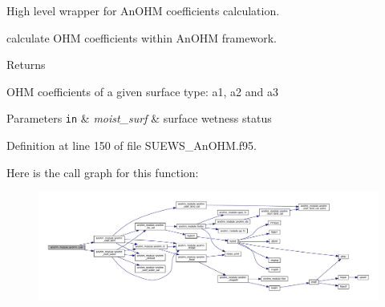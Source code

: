 High level wrapper for An\+O\+HM coefficients calculation. 

calculate O\+HM coefficients within An\+O\+HM framework. \begin{DoxyReturn}{Returns}

\begin{DoxyEnumerate}
\item O\+HM coefficients of a given surface type\+: a1, a2 and a3
\end{DoxyEnumerate}
\end{DoxyReturn}

\begin{DoxyParams}[1]{Parameters}
\mbox{\tt in}  & {\em moist\+\_\+surf} & surface wetness status \\
\hline
\end{DoxyParams}


Definition at line 150 of file S\+U\+E\+W\+S\+\_\+\+An\+O\+H\+M.\+f95.

Here is the call graph for this function\+:\nopagebreak
\begin{figure}[H]
\begin{center}
\leavevmode
\includegraphics[width=350pt]{namespaceanohm__module_a5aa773c6b5c4a66155eaeb1c86c70471_cgraph}
\end{center}
\end{figure}
\mbox{\label{namespaceanohm__module_abe3a233f6e7d95775554ccc25e1cac45}} 
